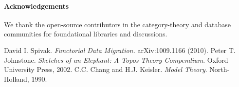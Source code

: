 \documentclass[11pt]{article}
\begin{document}
\paragraph{Acknowledgements}
We thank the open-source contributors in the category-theory and database communities for foundational libraries and discussions.


\begin{thebibliography}{9}
 David I. Spivak. \emph{Functorial Data Migration.} arXiv:1009.1166 (2010).
 Peter T. Johnstone. \emph{Sketches of an Elephant: A Topos Theory Compendium}. Oxford University Press, 2002.
 C.C. Chang and H.J. Keisler. \emph{Model Theory}. North-Holland, 1990.
\end{thebibliography}
\end{document}
